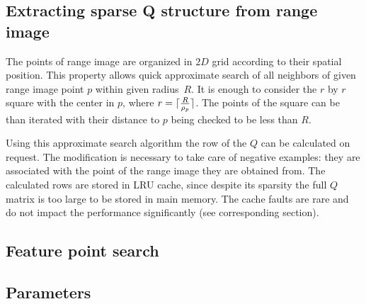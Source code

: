\subsection{Extracting sparse Q structure from range image}
The points of range image are organized in $2D$ grid according to their spatial position. This property allows quick approximate search of all neighbors of given range image point $p$ within given radius~$R$. It is enough to consider the $r$ by $r$ square with the center in $p$, where $r=\lceil \frac{R}{\rho_{p}} \rceil$. The points of the square can be than iterated with their distance to $p$ being checked to be less than $R$.

Using this approximate search algorithm the row of the $Q$ can be calculated on request. The modification is necessary to take care of negative examples: they are associated with the point of the range image they are obtained from. The calculated rows are stored in LRU cache, since despite its sparsity the full $Q$ matrix is too large to be stored in main memory. The cache faults are rare and do not impact the performance significantly (see corresponding section).

\subsection{Feature point search}

\subsection{Parameters}
